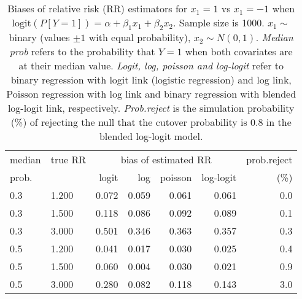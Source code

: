 \documentclass[12pt,a4paper]{article}
\begin{document}
\begin{table}[H] 
\small\sf\centering 
\caption{Biases of relative risk (RR) estimators for $x_1=1$ vs $x_1=-1$ when $\mbox{logit}(P[Y=1])=\alpha+\beta_1 x_1 + \beta_2 x_2$. Sample size is 1000. $x_1 \sim $binary (values $\pm 1$ with equal probability), $x_2 \sim N(0,1)$. {\it Median prob} refers to the probability that $Y=1$ when both covariates are at their median value. {\it Logit, log, poisson and log-logit} refer to binary regression with logit link (logistic regression) and log link, Poisson regression with log link and binary regression with blended log-logit link, respectively. {\it Prob.reject} is the simulation probability (\%) of rejecting the null that the cutover probability is $0.8$ in the blended log-logit model.} 
\begin{tabular}{llrrrrr} 
\toprule 
median & true RR & \multicolumn{4}{c}{bias of estimated RR} & prob.reject \\ 
prob. & & logit & log & poisson & log-logit  & (\%) \\ \midrule 
0.3 & 1.200 & 0.072 & 0.059 & 0.061 & 0.061 & 0.0 \\  
0.3 & 1.500 & 0.118 & 0.086 & 0.092 & 0.089 & 0.1 \\  
0.3 & 3.000 & 0.501 & 0.346 & 0.363 & 0.357 & 0.3 \\  
0.5 & 1.200 & 0.041 & 0.017 & 0.030 & 0.025 & 0.4 \\  
0.5 & 1.500 & 0.060 & 0.004 & 0.030 & 0.021 & 0.9 \\  
0.5 & 3.000 & 0.280 & 0.082 & 0.118 & 0.143 & 3.0 \\  
\bottomrule 
\end{tabular} 
\end{table} 
\end{document}
